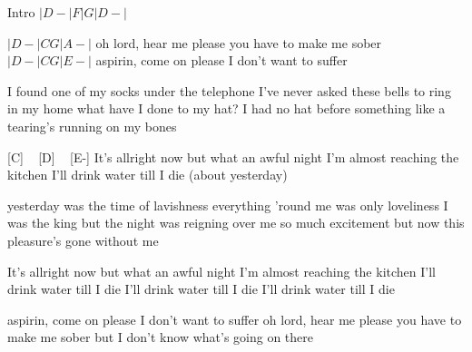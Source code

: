 
\begin{guitar}
Intro
$|D-|F|G|D-|$

$|D-|C G |A-|$
 oh lord, hear me please
you have to make me sober
$|D-|C G |E-|$
aspirin, come on please
I don't want to suffer


I found one of my socks
under the telephone
I've never asked these bells
to ring in my home
what have I done to my hat?
I had no hat before
something like a tearing's running on my bones

[C] ~ [D] ~ [E-]
It's allright now
but what an awful night
I'm almost reaching the kitchen
I'll drink water till I die (about yesterday)

yesterday was the time of lavishness
everything 'round me was only loveliness
I was the king but the night was reigning over me
so much excitement but now this pleasure's gone without me


It's allright now
but what an awful night
I'm almost reaching the kitchen
I'll drink water till I die
I'll drink water till I die
I'll drink water till I die

aspirin, come on please
I don't want to suffer
oh lord, hear me please
you have to make me sober
but I don't know what's going on there 
\end{guitar}